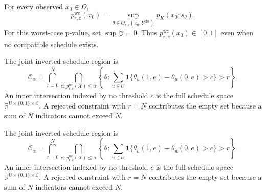 For every observed \(x_0\in\Omega\),
\[
p^{\mathrm{wc}}_{r,c}(x_0)
=\sup_{\theta\in\Theta_{r,c}(x_0,Y^{\mathrm{obs}})}
p_K(x_0;s_{\theta}).
\]
For this worst-case p-value, set \(\sup\varnothing=0\).  Thus
\(p^{\mathrm{wc}}_{r,c}(x_0)\in[0,1]\) even when no compatible schedule
exists.

The joint inverted schedule region is
\[
\mathcal C_{\alpha}
=\bigcap_{r=0}^{N}
  \bigcap_{c:\,p^{\mathrm{wc}}_{r,c}(X)\leq\alpha}
  \left\{\theta:
  \sum_{u\in U}\mathbf 1\{\theta_u(1,e)-\theta_u(0,e)>c\}>r
  \right\}.
\]
An inner intersection indexed by no threshold \(c\) is the full schedule space
\(\mathbb R^{U\times\{0,1\}\times\mathcal E}\).  A rejected constraint with
\(r=N\) contributes the empty set because a sum of \(N\) indicators cannot
exceed \(N\).

The joint inverted schedule region is
\[
\mathcal C_{\alpha}
=\bigcap_{r=0}^{N}
  \bigcap_{c:\,p^{\mathrm{wc}}_{r,c}(X)\leq\alpha}
  \left\{\theta:
  \sum_{u\in U}\mathbf 1\{\theta_u(1,e)-\theta_u(0,e)>c\}>r
  \right\}.
\]
An inner intersection indexed by no threshold \(c\) is the full schedule space
\(\mathbb R^{U\times\{0,1\}\times\mathcal E}\).  A rejected constraint with
\(r=N\) contributes the empty set because a sum of \(N\) indicators cannot
exceed \(N\).


